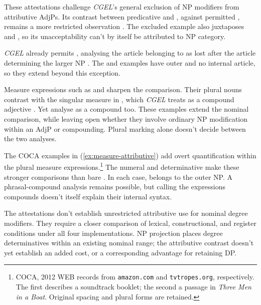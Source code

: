 \documentclass[12pt]{article}
\begin{document}
These attestations challenge \textit{CGEL}'s general exclusion of NP modifiers from attributive AdjPs. Its contrast between predicative  and , against permitted , remains a more restricted observation \citep[551--552]{huddleston2002}. The excluded example also juxtaposes  and , so its unacceptability can't by itself be attributed to NP category.

\textit{CGEL} already permits , analysing the article belonging to  as lost after the article determining the larger NP \citep[p.~552, n.~8]{huddleston2002}. The  and  examples have outer  and no internal article, so they extend beyond this exception.

Measure expressions such as  and  sharpen the comparison. Their plural nouns contrast with the singular measure in , which \textit{CGEL} treats as a compound adjective \citep[552, 1660]{huddleston2002}. Yet \textcite[68]{alegregordon1996} analyse  as a compound too. These examples extend the nominal comparison, while leaving open whether they involve ordinary NP modification within an AdjP or compounding. Plural marking alone doesn't decide between the two analyses.

The COCA examples in (\ref{ex:measure-attributive}) add overt quantification within the plural measure expressions.\footnote{COCA, 2012 WEB records from \nolinkurl{amazon.com} and \nolinkurl{tvtropes.org}, respectively. The first describes a soundtrack booklet; the second a passage in \textit{Three Men in a Boat}. Original spacing and plural forms are retained.} The numeral  and determinative  make these stronger comparisons than bare . In each case,  belongs to the outer NP. A phrasal-compound analysis remains possible, but calling the expressions compounds doesn't itself explain their internal syntax.

\ea\label{ex:measure-attributive}
\ea {}
\ex {}
\z\z

The attestations don't establish unrestricted attributive use for nominal degree modifiers. They require a closer comparison of lexical, constructional, and register conditions under all four implementations. NP projection places degree determinatives within an existing nominal range; the attributive contrast doesn't yet establish an added cost, or a corresponding advantage for retaining DP.
\end{document}
